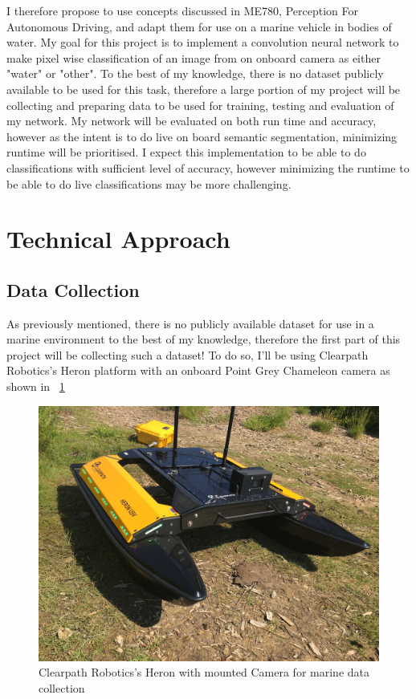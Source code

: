 \documentclass[10pt,twocolumn,letterpaper]{article}
\begin{document}
I therefore propose to use concepts discussed in ME780, Perception For Autonomous Driving,
and adapt them for use on a marine vehicle in bodies of water. My goal for this project
is to implement a convolution neural network to make pixel wise classification of an image
from on onboard camera as either "water" or "other". To the best of my knowledge, there is no
dataset publicly available to be used for this task, therefore a large portion of my project will be
collecting and preparing data to be used for training, testing and evaluation of my network. 
My network will be evaluated on both run time and accuracy, however as the intent is to do
live on board semantic segmentation, minimizing runtime will be prioritised. I expect this
implementation to be able to do classifications with sufficient level of accuracy, however
minimizing the runtime to be able to do live classifications may be more challenging.



\section{Technical Approach}
\subsection{Data Collection}
As previously mentioned, there is no publicly available dataset for use in a marine
environment to the best of my knowledge, therefore the first part of this project
will be collecting such a dataset! To do so, I'll be using Clearpath Robotics's
Heron platform with an onboard Point Grey Chameleon camera as shown in ~\ref{fig:heron}

\begin{figure}[h]	
\begin{center}
  \includegraphics[width=1.0\linewidth]{heron.JPG}
\end{center}
   \caption{Clearpath Robotics's Heron with mounted Camera for marine data collection}
\label{fig:heron}
\end{figure}
\end{document}
